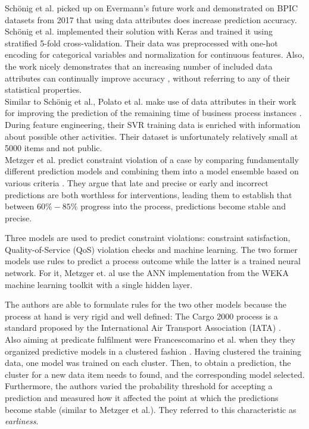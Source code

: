 Schönig et al. \cite{schoenig2018} picked up on Evermann's future work and demonstrated on BPIC datasets from 2017 that using data attributes does increase prediction accuracy. Schönig et al. implemented their solution with Keras and trained it using stratified 5-fold cross-validation. Their data was preprocessed with one-hot encoding for categorical variables and normalization for continuous features. Also, the work nicely demonstrates that an increasing number of included data attributes can continually improve accuracy \cite[p.5]{schoenig2018}, without referring to any of their statistical properties.\\

Similar to Schönig et al., Polato et al. make use of data attributes in their work for improving the prediction of the remaining time of business process instances \cite{polato2014}. During feature engineering, their SVR training data is enriched with information about possible other activities. Their dataset is unfortunately relatively small at 5000 items and not public.\\

Metzger et al. predict constraint violation of a case by comparing fundamentally different prediction models and combining them into a model ensemble based on various criteria \cite{metzger2015}. They argue that late and precise or early and incorrect predictions are both worthless for interventions, leading them to establish that between $60\% - 85\%$ progress into the process, predictions become stable and precise.

Three models are used to predict constraint violations: constraint satisfaction, Quality-of-Service (QoS) violation checks and machine learning. The two former models use rules to predict a process outcome while the latter is a trained neural network. For it, Metzger et. al use the ANN implementation from the WEKA machine learning toolkit with a single hidden layer. 

The authors are able to formulate rules for the two other models because the process at hand is very rigid and well defined: The Cargo 2000 process is a standard proposed by the International Air Transport Association (IATA) \cite{metzger2015}.\\

Also aiming at predicate fulfilment were Francescomarino et al. when they they organized predictive models in a clustered fashion \cite{francescomarino2015}. Having clustered the training data, one model was trained on each cluster. Then, to obtain a prediction, the cluster for a new data item needs to found, and the corresponding model selected. Furthermore, the authors varied the probability threshold for accepting a prediction and measured how it affected the point at which the predictions become stable (similar to Metzger et al.). They referred to this characteristic as \textit{earliness}.

